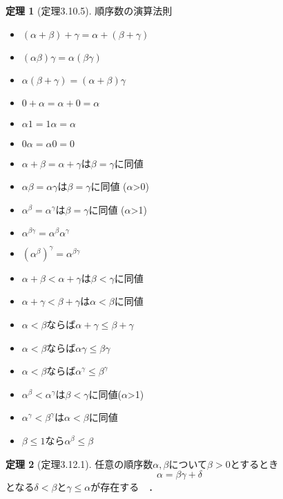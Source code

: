 \documentclass[dvipdfmx,a4paper,11pt]{report}
\theoremstyle{definition}
\newtheorem{thm}{定理}
\begin{document}
 \begin{tcolorbox}
 [colback = white, colframe = green!35!black, fonttitle = \bfseries,breakable = true]
\begin{thm}[定理3.10.5]
順序数の演算法則
\begin{itemize}
\item $(\alpha + \beta) + \gamma = \alpha + (\beta + \gamma)$
\item $(\alpha \beta)  \gamma = \alpha (\beta  \gamma)$
\item $\alpha (\beta + \gamma)= (\alpha + \beta)  \gamma$
\item $0 + \alpha = \alpha + 0 =\alpha$
\item $\alpha 1 = 1\alpha = \alpha$
\item $0  \alpha = \alpha  0 =0$
\item $\alpha  + \beta = \alpha + \gamma$は$\beta= \gamma$に同値
\item $\alpha  \beta = \alpha \gamma$は$\beta= \gamma$に同値 ($\alpha$>0)
\item $\alpha^\beta = \alpha^\gamma$は$\beta= \gamma$に同値 ($\alpha$>1)
\item $\alpha^{\beta\gamma} = \alpha^\beta  \alpha^\gamma$
\item  $(\alpha^{\beta})^{\gamma} = \alpha^{\beta \gamma}$
\item $\alpha  + \beta < \alpha + \gamma$は$\beta <\gamma$に同値
\item $\alpha  + \gamma < \beta + \gamma$は$\alpha <\beta$に同値
\item $\alpha <\beta$ならば$\alpha  + \gamma \le \beta + \gamma$
\item $\alpha <\beta$ならば$\alpha  \gamma \le \beta \gamma$
\item $\alpha <\beta$ならば$\alpha^\gamma \le \beta^\gamma$
\item $\alpha^\beta< \alpha^\gamma$は$\beta<\gamma$に同値($\alpha$>1)
\item $\alpha^\gamma< \beta^\gamma$は$\alpha<\beta$に同値
\item $\beta \le 1$なら$\alpha^\beta \le \beta$
\end{itemize}
\end{thm}
\end{tcolorbox}

 \begin{tcolorbox}
 [colback = white, colframe = green!35!black, fonttitle = \bfseries,breakable = true]
\begin{thm}[定理3.12.1]
任意の順序数$\alpha, \beta$について$\beta>0$とするとき
$$
\alpha = \beta \gamma + \delta
$$
となる$\delta < \beta$と$\gamma \le \alpha$が存在する　．
\end{thm}
\end{tcolorbox}
\end{document}
